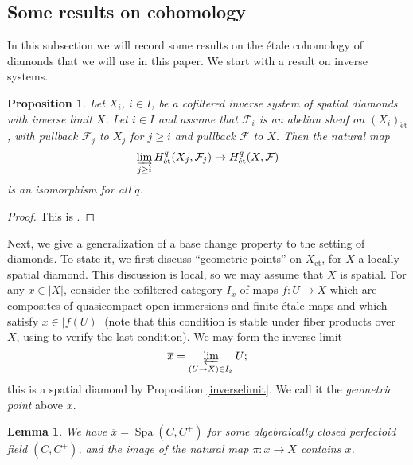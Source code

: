 \documentclass{amsart}
\newtheorem{lemma}[subsubsection]{Lemma}
\newtheorem{prop}[subsubsection]{Proposition}
\theoremstyle{remark}
\numberwithin{equation}{subsection}
\newcommand{\cF}{{\mathcal F}}
\DeclareMathOperator{\Spa}{Spa}
\newcommand{\et}{\mathrm{\acute{e}t}}
\newcommand{\ol}{\overline}
\renewcommand{\(}{\left(}
\renewcommand{\)}{\right)}
\begin{document}
\subsection{Some results on cohomology}

In this subsection we will record some results on the \'etale cohomology of diamonds that we will use in this paper. We start with a result on inverse systems.

\begin{prop}\label{invlimcoh}
Let $X_{i}$, $i\in I$, be a cofiltered inverse system of spatial diamonds with inverse limit $X$. Let $i\in I$ and assume that $\cF_{i}$ is an abelian sheaf on $(X_{i})_{\et}$, with pullback $\cF_{j}$ to $X_{j}$ for $j\geq i$ and pullback $\cF$ to $X$. Then the natural map
$$ \varinjlim_{j\geq i} H_{\et}^{q}(X_{j},\cF_{j}) \to H^{q}_{\et}(X,\cF) $$
is an isomorphism for all $q$.
\end{prop}

\begin{proof}
This is \cite[Proposition 14.9]{diamonds}.
\end{proof}

Next, we give a generalization of a base change property \cite[Lemma 4.4.1]{caraiani-scholze} to the setting of diamonds. To state it, we first discuss ``geometric points'' on $X_{\et}$, for $X$ a locally spatial diamond. This discussion is local, so we may assume that $X$ is spatial. For any $x\in |X|$, consider the cofiltered category $I_{x}$ of maps $f \colon U \to X$ which are composites of quasicompact open immersions and finite \'etale maps and which satisfy $x\in |f(U)|$ (note that this condition is stable under fiber products over $X$, using \cite[Proposition 12.10]{diamonds} to verify the last condition).
We may form the inverse limit
$$ \ol{x} = \varprojlim_{(U \to X) \in I_{x}} U; $$
this is a spatial diamond by Proposition \ref{inverselimit}. We call it the \emph{geometric point} above $x$. 

\begin{lemma}\label{geometricpt}
We have $\ol{x}=\Spa(C,C^{+})$ for some algebraically closed perfectoid field $(C,C^{+})$, and the image of the natural map $\pi \colon \ol{x} \to X$ contains $x$.
\end{lemma}
\end{document}
